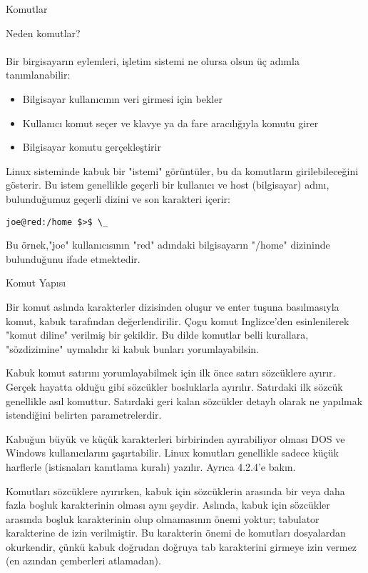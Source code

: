 \documentclass[10pt,a5paper]{book}
\begin{document}
\begin{section}{Komutlar}
\begin{subsection}{Neden komutlar?}
\paragraph{}{Bir birgisayarın eylemleri, işletim sistemi ne olursa olsun üç adımla tanımlanabilir:
\begin{itemize}
 \item Bilgisayar kullanıcının veri girmesi için bekler
 \item Kullanıcı komut seçer ve klavye ya da fare aracılığıyla komutu girer
 \item Bilgisayar komutu gerçekleştirir
\end{itemize}}

Linux sisteminde kabuk bir "istemi" görüntüler, bu da komutların girilebileceğini gösterir. Bu istem genellikle geçerli bir kullanıcı ve host (bilgisayar) adını, bulunduğumuz geçerli dizini ve son karakteri içerir:
\begin{verbatim}joe@red:/home $>$ \_
\end{verbatim}

Bu örnek,"joe" kullanıcısının "red" adındaki bilgisayarın "/home" dizininde bulunduğunu ifade etmektedir.
\end{subsection}
\begin{subsection}{Komut Yapısı}

Bir komut aslında karakterler dizisinden oluşur ve enter tuşuna basılmasıyla komut, kabuk tarafından değerlendirilir. Çogu komut Inglizce'den esinlenilerek "komut diline" verilmiş bir şekildir. Bu dilde komutlar belli kurallara, "sözdizimine" uymalıdır ki kabuk bunları yorumlayabilsin.

Kabuk komut satırını yorumlayabilmek için ilk önce satırı sözcüklere ayırır. Gerçek hayatta olduğu gibi sözcükler bosluklarla ayırılır. Satırdaki ilk sözcük genellikle asıl komuttur. Satırdaki geri kalan sözcükler detaylı olarak ne yapılmak istendiğini belirten parametrelerdir.

Kabuğun büyük ve küçük karakterleri birbirinden ayırabiliyor olması DOS ve Windows kullanıcılarını şaşırtabilir. Linux komutları genellikle sadece küçük harflerle (istisnaları kanıtlama kuralı) yazılır. Ayrıca 4.2.4'e bakın.

Komutları sözcüklere ayırırken, kabuk için sözcüklerin arasında bir veya daha fazla boşluk karakterinin olması aynı şeydir. Aslında, kabuk için sözcükler arasında boşluk karakterinin olup olmamasının önemi yoktur; tabulator karakterine de izin verilmiştir. Bu karakterin önemi de komutları dosyalardan okurkendir, çünkü kabuk doğrudan doğruya tab karakterini girmeye izin vermez (en azından çemberleri atlamadan).


\end{subsection}
\end{section}
\end{document}
